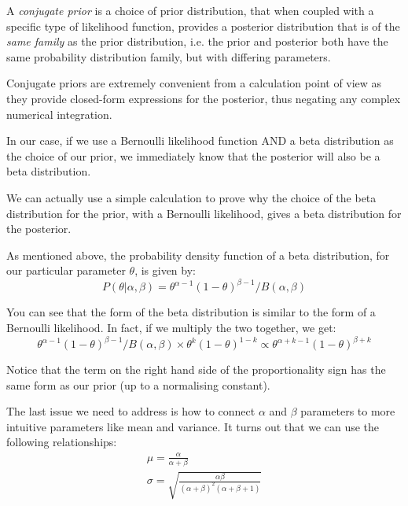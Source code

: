 A \emph{conjugate prior} is a choice of prior distribution, that when coupled with a specific type of likelihood function, provides a posterior distribution that is of the \emph{same family} as the prior distribution, i.e. the prior and posterior both have the same probability distribution family, but with differing parameters.

Conjugate priors are extremely convenient from a calculation point of view as they provide closed-form expressions for the posterior, thus negating any complex numerical integration.

In our case, if we use a Bernoulli likelihood function AND a beta distribution as the choice of our prior, we immediately know that the posterior will also be a beta distribution.


We can actually use a simple calculation to prove why the choice of the beta distribution for the prior, with a Bernoulli likelihood, gives a beta distribution for the posterior.

As mentioned above, the probability density function of a beta distribution, for our particular parameter $\theta$, is given by:
\begin{equation}
  P(\theta|\alpha,\beta)=\theta^{\alpha -1}(1-\theta)^{\beta-1}/B(\alpha,\beta)
\end{equation}

You can see that the form of the beta distribution is similar to the form of a Bernoulli likelihood. In fact, if we multiply the two together, we get:
\begin{equation}
  \theta^{\alpha -1}(1-\theta)^{\beta-1}/B(\alpha,\beta)\times \theta^k(1-\theta)^{1-k} \propto \theta^{\alpha+k-1}(1-\theta)^{\beta+k}
\end{equation}

Notice that the term on the right hand side of the proportionality sign has the same form as our prior (up to a normalising constant).

The last issue we need to address is how to connect $\alpha$ and $\beta$ parameters to more intuitive parameters like mean and variance. It turns out that we can use the following relationships:
\begin{equation}
  \begin{gathered}
    \mu = \frac{\alpha}{\alpha+\beta} \\
    \sigma = \sqrt{\frac{\alpha\beta}{(\alpha + \beta)^2(\alpha + \beta + 1)}}
  \end{gathered}
\end{equation}

